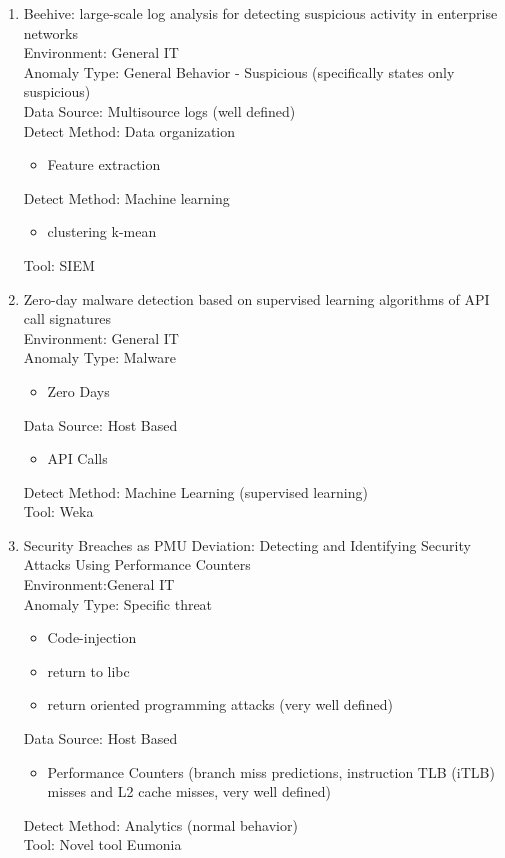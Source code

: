 \documentclass[10pt]{IEEEtran}
\begin{document}
\begin{enumerate}
    \item 
    Beehive: large-scale log analysis for detecting suspicious activity in enterprise networks\cite{yen2013beehive}\\
    Environment: General IT\\
    Anomaly Type: General Behavior - Suspicious (specifically states only suspicious)\\
    Data Source: Multisource logs (well defined)\\
    Detect Method: Data organization
    \begin{itemize}
        \item Feature extraction
    \end{itemize}
    Detect Method: Machine learning 
    \begin{itemize}
        \item clustering k-mean
    \end{itemize}
    Tool: SIEM 
    
    \item 
    Zero-day malware detection based on supervised learning algorithms of API call signatures\cite{alazab2011zero}\\
    Environment: General IT\\
    Anomaly Type: Malware
    \begin{itemize}
        \item Zero Days
    \end{itemize}
    Data Source: Host Based
    \begin{itemize}
        \item API Calls
    \end{itemize}
    Detect Method: Machine Learning (supervised learning)  \\
    Tool: Weka
    
    \item
    Security Breaches as PMU Deviation: Detecting and Identifying Security Attacks Using Performance Counters\cite{yuan2011security}\\
    Environment:General IT\\
    Anomaly Type: Specific threat
    \begin{itemize}
        \item Code-injection
        \item return to libc
        \item return oriented programming attacks (very well defined)
    \end{itemize}
    Data Source: Host Based
    \begin{itemize}
        \item Performance Counters (branch miss predictions, instruction TLB (iTLB) misses and L2 cache misses, very well defined) \\
    \end{itemize}
    Detect Method: Analytics (normal behavior) \\
    Tool: Novel tool Eumonia 
   

\end{enumerate}
\end{document}
